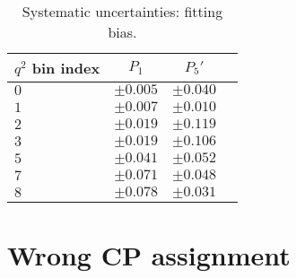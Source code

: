 \begin{table*}[!htb]
  \begin {center}
    \begin{small}
      \caption{Systematic uncertainties: fitting bias.
        \label{tab:fit bias}}
      \begin{tabular}{l|c|c|c}
        $q^2$ bin index  & $P_1$ & $P_5'$  \\
        \hline
        $0$ & $\pm0.005$ & $\pm0.040$ \\
        $1$ & $\pm0.007$ & $\pm0.010$ \\
        $2$ & $\pm0.019$ & $\pm0.119$ \\
        $3$ & $\pm0.019$ & $\pm0.106$ \\
        $5$ & $\pm0.041$ & $\pm0.052$ \\
        $7$ & $\pm0.071$ & $\pm0.048$ \\
        $8$ & $\pm0.078$ & $\pm0.031$ \\
      \end{tabular}
    \end{small}
  \end{center}
\end{table*}


\section{Wrong CP assignment}
\label{sec:sys-mistag}



